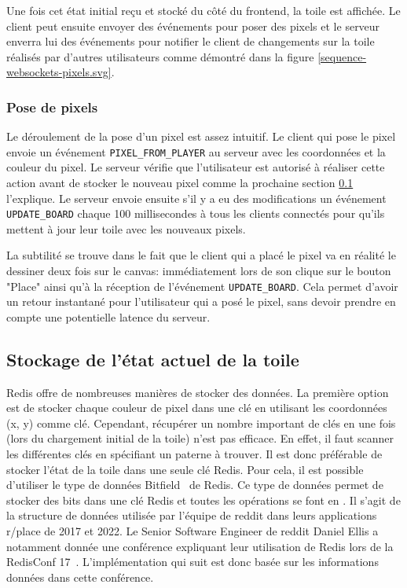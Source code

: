 Une fois cet état initial reçu et stocké du côté du frontend, la toile est affichée. Le client peut ensuite envoyer des événements pour poser des pixels et le serveur enverra lui des événements pour notifier le client de changements sur la toile réalisés par d'autres utilisateurs comme démontré dans la figure \ref{sequence-websockets-pixels.svg}.

\subsubsection{Pose de pixels}


Le déroulement de la pose d'un pixel est assez intuitif. Le client qui pose le pixel envoie un événement \texttt{PIXEL\_FROM\_PLAYER} au serveur avec les coordonnées et la couleur du pixel. Le serveur vérifie que l'utilisateur est autorisé à réaliser cette action avant de stocker le nouveau pixel comme la prochaine section \ref{section:stockage} l'explique. Le serveur envoie ensuite s'il y a eu des modifications un événement \texttt{UPDATE\_BOARD} chaque 100 millisecondes à tous les clients connectés pour qu'ils mettent à jour leur toile avec les nouveaux pixels.

La subtilité se trouve dans le fait que le client qui a placé le pixel va en réalité le dessiner deux fois sur le canvas: immédiatement lors de son clique sur le bouton "Place" ainsi qu'à la réception de l'événement \texttt{UPDATE\_BOARD}. Cela permet d'avoir un retour instantané pour l'utilisateur qui a posé le pixel, sans devoir prendre en compte une potentielle latence du serveur.

\subsection{Stockage de l'état actuel de la toile}
\label{section:stockage}

Redis offre de nombreuses manières de stocker des données. La première option est de stocker chaque couleur de pixel dans une clé en utilisant les coordonnées (x, y) comme clé. Cependant, récupérer un nombre important de clés en une fois (lors du chargement initial de la toile) n'est pas efficace. En effet, il faut scanner les différentes clés en spécifiant un paterne à trouver. Il est donc préférable de stocker l'état de la toile dans une seule clé Redis. Pour cela, il est possible d'utiliser le type de données Bitfield~\cite{bitfield} de Redis. Ce type de données permet de stocker des bits dans une clé Redis et toutes les opérations se font en . Il s'agit de la structure de données utilisée par l'équipe de \gls{reddit} dans leurs applications r/place de 2017 et 2022. Le Senior Software Engineer de \gls{reddit} Daniel Ellis a notamment donnée une conférence expliquant leur utilisation de Redis lors de la RedisConf 17~\cite{redisconf}. L'implémentation qui suit est donc basée sur les informations données dans cette conférence.

